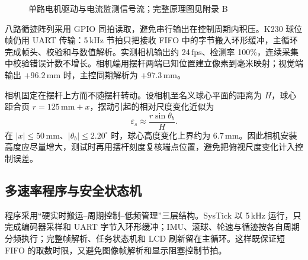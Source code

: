 \documentclass[12pt,a4paper]{ctexart}
\newcommand{\unit}[1]{\ensuremath{\,\mathrm{#1}}}
\newcommand{\Ohm}{\text{Ω}}
\begin{document}
\begin{figure}[H]
\centering
{}
\caption{单路电机驱动与电流监测信号流；完整原理图见附录 B}
\label{fig:driver}
\end{figure}

八路循迹阵列采用 GPIO 同拍读取，避免串行输出在控制周期内积压。K230 球位帧仍用 UART 传输：5\unit{kHz} 节拍只把接收 FIFO 中的字节搬入环形缓冲，主循环完成帧头、校验和与数值解析。实测相机输出约 24\unit{fps}、检测率 100\%，连续采集中校验错误计数不增长。相机端用摆杆两端已知位置建立像素到毫米映射；视觉端输出 $+96.2\unit{mm}$ 时，主控同期解析为 $+97.3\unit{mm}$。

相机固定在摆杆上方而不随摆杆转动。设相机至名义球心平面的距离为 $H$，球心距合页 $r=125\unit{mm}+x$，摆动引起的相对尺度变化近似为
\begin{equation}
 \varepsilon_s\approx\frac{r\sin\theta_b}{H}.
\label{eq:perspective}
\end{equation}
在 $|x|\le50\unit{mm}$、$|\theta_b|\le2.20^\circ$ 时，球心高度变化上界约为 $6.7\unit{mm}$。因此相机安装高度应尽量增大，测试时再用摆杆刻度复核端点位置，避免把俯视尺度变化计入控制误差。

\subsection{多速率程序与安全状态机}

程序采用“硬实时搬运--周期控制--低频管理”三层结构。SysTick 以 5\unit{kHz} 运行，只完成编码器采样和 UART 字节入环形缓冲；IMU、滚球、轮速与循迹按各自周期分频执行；完整帧解析、任务状态机和 LCD 刷新留在主循环。这样既保证短 FIFO 的取数时限，又避免图像帧解析和显示阻塞控制节拍。
\end{document}
